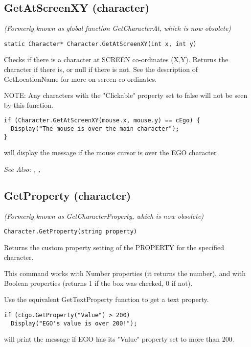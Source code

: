 \subsection{GetAtScreenXY (character)}\label{Character.GetAtScreenXY}%

\it{(Formerly known as global function GetCharacterAt, which is now obsolete)}

\begin{verbatim}
static Character* Character.GetAtScreenXY(int x, int y)
\end{verbatim}
Checks if there is a character at SCREEN co-ordinates (X,Y).
Returns the character if there is, or null if there is not.
See the description of GetLocationName for more on screen co-ordinates.

NOTE: Any characters with the "Clickable" property set to false will not be seen
by this function.

\begin{verbatim}
if (Character.GetAtScreenXY(mouse.x, mouse.y) == cEgo) {
  Display("The mouse is over the main character");
}
\end{verbatim}
will display the message if the mouse cursor is over the EGO character

\it{See Also:} ,
,


\subsection{GetProperty (character)}\label{Character.GetProperty}%

\it{(Formerly known as GetCharacterProperty, which is now obsolete)}

\begin{verbatim}
Character.GetProperty(string property)
\end{verbatim}
Returns the custom property setting of the PROPERTY for the specified character.

This command works with Number properties (it returns the number), and with Boolean
properties (returns 1 if the box was checked, 0 if not).

Use the equivalent GetTextProperty function to get a text property.

\begin{verbatim}
if (cEgo.GetProperty("Value") > 200)
  Display("EGO's value is over 200!");
\end{verbatim}
will print the message if EGO has its "Value" property set to more than 200.

